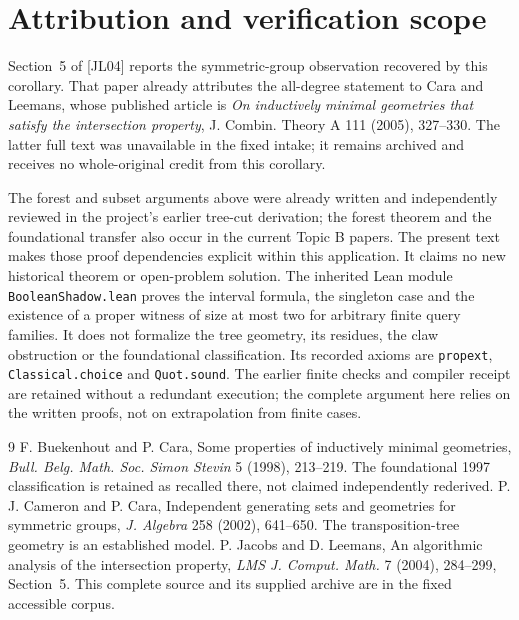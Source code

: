 \documentclass[11pt,a4paper]{article}
\begin{document}
\section*{Attribution and verification scope}
Section~5 of [JL04] reports the symmetric-group observation recovered
by this corollary. That paper already attributes the all-degree
statement to Cara and Leemans, whose published article is
\emph{On inductively minimal geometries that satisfy the intersection
property}, J. Combin. Theory A 111 (2005), 327--330. The latter full text
was unavailable in the fixed intake; it remains archived and receives
no whole-original credit from this corollary.

The forest and subset arguments above were already written and
independently reviewed in the project's earlier tree-cut derivation;
the forest theorem and the foundational transfer also occur in the
current Topic B papers. The present text makes those proof dependencies
explicit within this application. It claims no new historical theorem
or open-problem solution. The inherited Lean module
\texttt{BooleanShadow.lean} proves the interval formula, the singleton
case and the existence of a proper witness of size at most two for
arbitrary finite query families. It does not formalize the tree geometry,
its residues, the claw obstruction or the foundational classification.
Its recorded axioms are \texttt{propext}, \texttt{Classical.choice} and
\texttt{Quot.sound}. The earlier finite checks and compiler receipt are
retained without a redundant execution; the complete argument here
relies on the written proofs, not on extrapolation from finite cases.

\begin{thebibliography}{9}
 F. Buekenhout and P. Cara, Some properties of inductively
minimal geometries, \emph{Bull. Belg. Math. Soc. Simon Stevin} 5 (1998),
213--219. The foundational 1997 classification is retained as recalled
there, not claimed independently rederived.
 P. J. Cameron and P. Cara, Independent generating sets
and geometries for symmetric groups, \emph{J. Algebra} 258 (2002),
641--650. The transposition-tree geometry is an established model.
 P. Jacobs and D. Leemans, An algorithmic analysis of the
intersection property, \emph{LMS J. Comput. Math.} 7 (2004), 284--299,
Section~5. This complete source and its supplied archive are in the
fixed accessible corpus.
\end{thebibliography}
\end{document}
